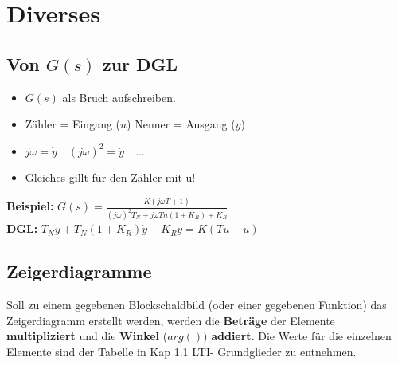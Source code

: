 \section{Diverses}

\subsection{Von $G(s)$ zur DGL}
  \begin{multicols}{2}
    \begin{itemize}
      \item $G(s)$ als Bruch aufschreiben.
			\item Zähler = Eingang ($u$) \quad Nenner = Ausgang ($y$)
 			\item $j\omega = \dot{y} \quad (j\omega)^2 = \ddot{y} \quad \ldots $
 			\item Gleiches gillt für den Zähler mit u!
		\end{itemize}
	\columnbreak
		\textbf{Beispiel:} $G(s) = \frac{K(j \omega T + 1)}{(j\omega)^2 T_N + j \omega Tn(1+K_R) + K_R}$ \\			
		\textbf{DGL:} $T_N \ddot{y} + T_N(1+K_R) \dot{y} + K_R y = K(T \dot{u} + u)$
  \end{multicols}    	
    
\subsection{Zeigerdiagramme}
  Soll zu einem gegebenen Blockschaldbild (oder einer gegebenen Funktion) das Zeigerdiagramm erstellt 
  werden, werden die \textbf{Beträge} der Elemente \textbf{multipliziert} und
  die \textbf{Winkel} ($arg()$) \textbf{addiert}. Die Werte für die einzelnen Elemente sind der Tabelle in Kap 1.1 LTI-  
  Grundglieder zu entnehmen. 

